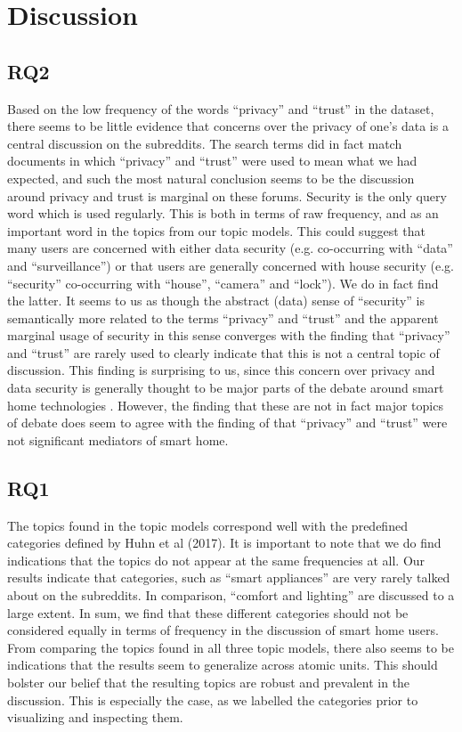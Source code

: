 \documentclass{article}
\begin{document}
    \section{Discussion}
    \subsection{RQ2}
    Based on the low frequency of the words “privacy” and “trust” in the dataset, there seems to be little evidence that concerns over the privacy of one's data is a central discussion on the subreddits. The search terms did in fact match documents in which “privacy” and “trust” were used to mean what we had expected, and such the most natural conclusion seems to be the discussion around privacy and trust is marginal on these forums. 
Security is the only query word which is used regularly. This is both in terms of raw frequency, and as an important word in the topics from our topic models. This could suggest that many users are concerned with either data security (e.g. co-occurring with “data” and “surveillance”) or that users are generally concerned with house security (e.g. “security” co-occurring with “house”, “camera” and “lock”). We do in fact find the latter. It seems to us as though the abstract (data) sense of “security” is semantically more related to the terms “privacy” and “trust” and the apparent marginal usage of security in this sense converges with the finding that “privacy” and “trust” are rarely used to clearly indicate that this is not a central topic of discussion. 
This finding is surprising to us, since this concern over privacy and data security is generally thought to be major parts of the debate around smart home technologies \cite{hubert2020take,tabassum2019investigating}. However, the finding that these are not in fact major topics of debate does seem to agree with the finding of \cite{hubert2020take} that “privacy” and “trust” were not significant mediators of smart home. 

    \subsection{RQ1}
    The topics found in the topic models correspond well with the predefined categories defined by Huhn et al (2017). It is important to note that we do find indications that the topics do not appear at the same frequencies at all. Our results indicate that categories, such as “smart appliances” are very rarely talked about on the subreddits. In comparison, “comfort and lighting” are discussed to a large extent. In sum, we find that these different categories should not be considered equally in terms of frequency in the discussion of smart home users.
From comparing the topics found in all three topic models, there also seems to be indications that the results seem to generalize across atomic units. This should bolster our belief that the resulting topics are robust and prevalent in the discussion. This is especially the case, as we labelled the categories prior to visualizing and inspecting them. 
\end{document}
